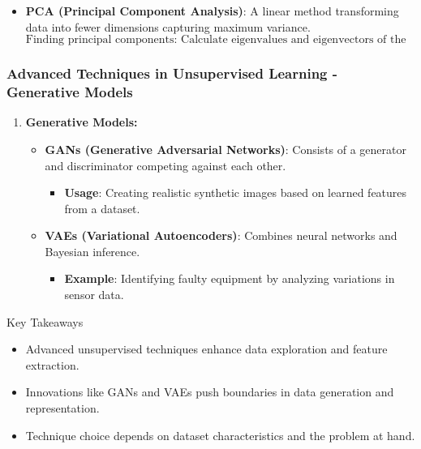 \documentclass[aspectratio=169]{beamer}
\begin{document}
\begin{frame}[fragile]
\begin{enumerate}
\begin{itemize}
\begin{itemize}
            \end{itemize}
            \item \textbf{PCA (Principal Component Analysis)}: 
            A linear method transforming data into fewer dimensions capturing maximum variance.
            \begin{equation}
                \text{Finding principal components: Calculate eigenvalues and eigenvectors of the covariance matrix.}
            \end{equation}
        \end{itemize}
    \end{enumerate}
\end{frame}

\begin{frame}[fragile]
    \frametitle{Advanced Techniques in Unsupervised Learning - Generative Models}
    \begin{enumerate}[resume]
        \item \textbf{Generative Models:}
        \begin{itemize}
            \item \textbf{GANs (Generative Adversarial Networks)}: Consists of a generator and discriminator competing against each other.
            \begin{itemize}
                \item \textbf{Usage}: Creating realistic synthetic images based on learned features from a dataset.
            \end{itemize}
            \item \textbf{VAEs (Variational Autoencoders)}: Combines neural networks and Bayesian inference.
            \begin{itemize}
                \item \textbf{Example}: Identifying faulty equipment by analyzing variations in sensor data.
            \end{itemize}
        \end{itemize}
    \end{enumerate}
    
    \begin{block}{Key Takeaways}
        \begin{itemize}
            \item Advanced unsupervised techniques enhance data exploration and feature extraction.
            \item Innovations like GANs and VAEs push boundaries in data generation and representation.
            \item Technique choice depends on dataset characteristics and the problem at hand.
        \end{itemize}
    \end{block}
\end{frame}
\end{document}
